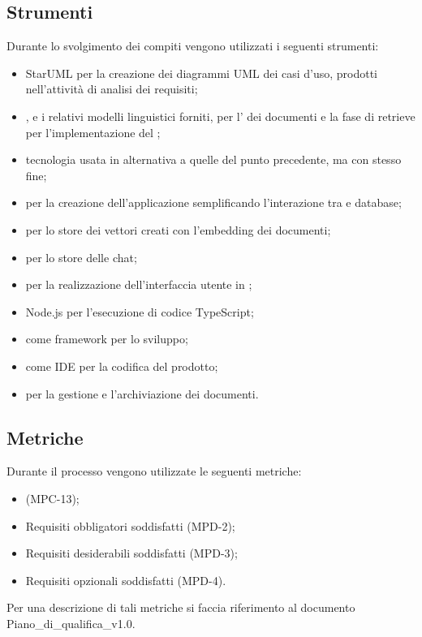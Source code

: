 \subsection{Strumenti}
Durante lo svolgimento dei compiti vengono utilizzati i seguenti strumenti:
\begin{itemize}
    \item StarUML per la creazione dei diagrammi UML dei casi d'uso, prodotti nell'attività di analisi dei requisiti;
    \item {}, e i relativi modelli linguistici forniti, per l' dei documenti e la fase di retrieve per l'implementazione del ;
    \item {} tecnologia usata in alternativa a quelle del punto precedente, ma con stesso fine;
    \item {} per la creazione dell'applicazione semplificando l'interazione tra  e database;
    \item {} per lo store dei vettori creati con l'embedding dei documenti;
    \item {} per lo store delle chat;
    \item {} per la realizzazione dell'interfaccia utente in ;
    \item Node.js per l'esecuzione di codice TypeScript;
    \item {} come framework per lo sviluppo;
    \item {} come IDE per la codifica del prodotto;
    \item {} per la gestione e l'archiviazione dei documenti.
\end{itemize}

\subsection{Metriche}
Durante il processo vengono utilizzate le seguenti metriche:
\begin{itemize}
    \item {} (MPC-13);
    \item Requisiti obbligatori soddisfatti (MPD-2);
    \item Requisiti desiderabili soddisfatti (MPD-3);
    \item Requisiti opzionali soddisfatti (MPD-4).
\end{itemize}
Per una descrizione di tali metriche si faccia riferimento al documento Piano\_di\_qualifica\_v1.0.
\newpage


